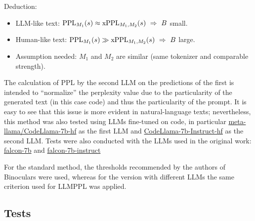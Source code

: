 Deduction:
\begin{itemize}
\item LLM-like text: $\mathrm{PPL}_{M_1}(s)\approx \mathrm{xPPL}_{M_1,M_2}(s)\ \Rightarrow\ B$ small.
\item Human-like text: $\mathrm{PPL}_{M_1}(s)\gg \mathrm{xPPL}_{M_1,M_2}(s)\ \Rightarrow\ B$ large.
\item Assumption needed: $M_1$ and $M_2$ are similar (same tokenizer and comparable strength).
\end{itemize}
The calculation of PPL by the second LLM on the predictions of 
the first is intended to “normalize” the perplexity value due to 
the particularity of the generated text (in this case code) and thus 
the particularity of the prompt. It is easy to see that this issue 
is more evident in natural-language texts; nevertheless, this 
method was also tested using LLMs fine-tuned on code, in particular 
\href{https://huggingface.co/meta-llama/CodeLlama-7b-hf}
{meta-llama/CodeLlama-7b-hf} as the first LLM and 
\href{https://huggingface.co/meta-llama/CodeLlama-7b-Instruct-hf}{CodeLlama-7b-Instruct-hf} 
\cite{roziere2023code} as the second LLM.
Tests were also conducted with the LLMs used in the original work:
\href{https://huggingface.co/tiiuae/falcon-7b}{falcon-7b} and 
\href{https://huggingface.co/tiiuae/falcon-7b-instruct}{falcon-7b-instruct}
\cite{falcon40b}

For the standard method, the thresholds recommended by the 
authors of Binoculars were used, whereas for the version with different 
LLMs the same criterion used for LLMPPL was applied.







\clearpage
\subsection{Tests}
